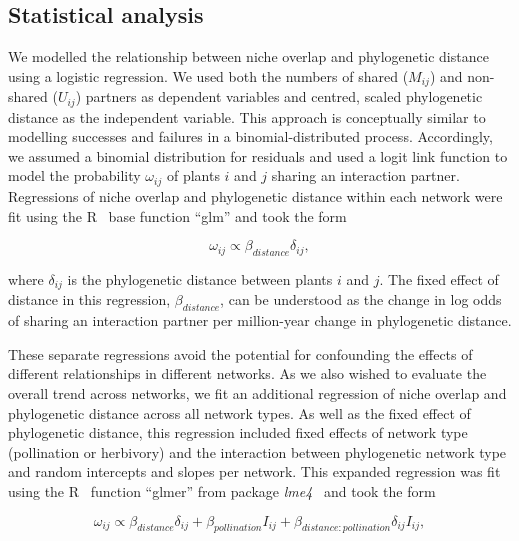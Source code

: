 \documentclass[12pt]{article}
\begin{document}
\begin{spacing}{1.5}

\subsection*{Statistical analysis} 

  We modelled the relationship between niche overlap and phylogenetic 
  distance using a logistic regression. We used both the numbers of shared 
  ($M_{ij}$) and non-shared ($U_{ij}$) partners as dependent variables and 
  centred, scaled phylogenetic distance as the independent variable. This 
  approach is conceptually similar to modelling successes and failures in a 
  binomial-distributed process. Accordingly, we assumed a binomial 
  distribution for residuals and used a logit link function to model the 
  probability $\omega_{ij}$ of plants $i$ and $j$ sharing an interaction 
  partner. Regressions of niche overlap and phylogenetic distance within 
  each network were fit using the R~\citep{R} base function ``glm'' and 
  took the form

    \begin{equation}
      \omega_{ij} \propto \beta_{distance}\delta_{ij} ,
      \label{basic}
    \end{equation}

  where $\delta_{ij}$ is the phylogenetic distance between plants $i$ and 
  $j$. The fixed effect of distance in this regression, $\beta_{distance}$, 
  can be understood as the change in log odds of sharing an interaction 
  partner per million-year change in phylogenetic distance. 


  These separate regressions avoid the potential for confounding the effects
  of different relationships in different networks. As we also wished to 
  evaluate the overall trend across networks, we fit an additional
  regression of niche overlap and phylogenetic distance across all network 
  types. As well as the fixed effect of phylogenetic distance, this 
  regression included fixed effects of network type (pollination or 
  herbivory) and the interaction between phylogenetic network type and 
  random intercepts and slopes per network. This expanded regression was fit
  using the R~\citep{R} function ``glmer'' from package 
  \emph{lme4}~\citep{lme4} and took the form

    \begin{equation}
      \omega_{ij} \propto \beta_{distance} \delta_{ij} + \beta_{pollination} I_{ij} + \beta_{distance:pollination} \delta_{ij} I_{ij} ,
    \end{equation}


\end{spacing}
\end{document}
